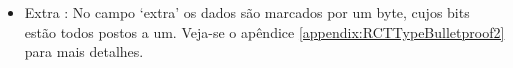 \begin{itemize}
    \item Extra : No campo `extra' os dados são marcados por um byte, cujos bits estão todos postos a um. Veja-se o apêndice \ref{appendix:RCTTypeBulletproof2} para mais detalhes. 
\end{itemize}
